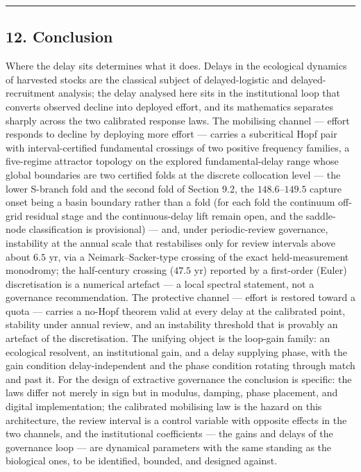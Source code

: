 \documentclass[11pt]{article}
\begin{document}
\begin{center}\rule{0.5\linewidth}{0.5pt}\end{center}

\subsection{12. Conclusion}\label{conclusion}

Where the delay sits determines what it does. Delays in the ecological
dynamics of harvested stocks are the classical subject of
delayed-logistic and delayed-recruitment analysis; the delay analysed
here sits in the institutional loop that converts observed decline into
deployed effort, and its mathematics separates sharply across the two
calibrated response laws. The mobilising channel --- effort responds to
decline by deploying more effort --- carries a subcritical Hopf pair
with interval-certified fundamental crossings of two positive frequency
families, a five-regime attractor topology on the explored
fundamental-delay range whose global boundaries are two certified folds
at the discrete collocation level --- the lower S-branch fold and the
second fold of Section 9.2, the \(148.6\)--\(149.5\) capture onset being
a basin boundary rather than a fold (for each fold the continuum
off-grid residual stage and the continuous-delay lift remain open, and
the saddle-node classification is provisional) --- and, under
periodic-review governance, instability at the annual scale that
restabilises only for review intervals above about \(6.5\) yr, via a
Neimark--Sacker-type crossing of the exact held-measurement monodromy;
the half-century crossing (\(47.5\) yr) reported by a first-order
(Euler) discretisation is a numerical artefact --- a local spectral
statement, not a governance recommendation. The protective channel ---
effort is restored toward a quota --- carries a no-Hopf theorem valid at
every delay at the calibrated point, stability under annual review, and
an instability threshold that is provably an artefact of the
discretisation. The unifying object is the loop-gain family: an
ecological resolvent, an institutional gain, and a delay supplying
phase, with the gain condition delay-independent and the phase condition
rotating through match and past it. For the design of extractive
governance the conclusion is specific: the laws differ not merely in
sign but in modulus, damping, phase placement, and digital
implementation; the calibrated mobilising law is the hazard on this
architecture, the review interval is a control variable with opposite
effects in the two channels, and the institutional coefficients --- the
gains and delays of the governance loop --- are dynamical parameters
with the same standing as the biological ones, to be identified,
bounded, and designed against.
\end{document}
